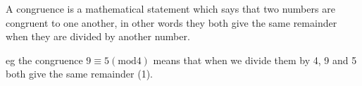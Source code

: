 A congruence is a mathematical statement which says that two numbers
are congruent to one another, in other words they both give the
same remainder when they are divided by another number.
\par
eg the congruence $ 9 \equiv 5 (\mathrm{mod} 4) $ means that when we divide them by 4,
9 and 5 both give the same remainder (1).